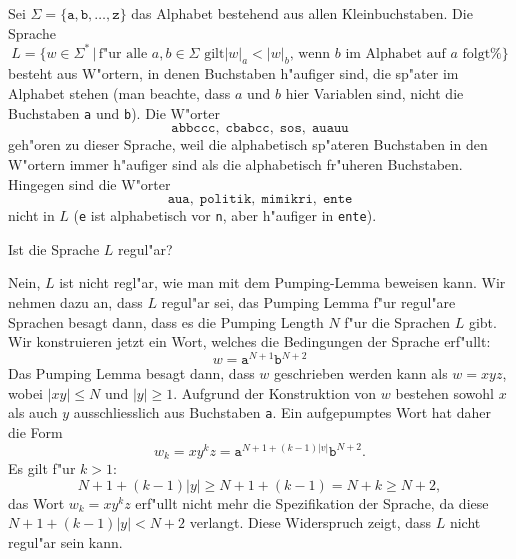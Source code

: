 Sei $\Sigma=\{\texttt{a},\texttt{b},\dots,\texttt{z}\}$ das Alphabet
bestehend aus allen Kleinbuchstaben. Die Sprache
\[
L=\{ w\in\Sigma^*
\,
|\,
\text{
f"ur alle $a,b\in\Sigma$ gilt
$|w|_a < |w|_b$, wenn $b$ im Alphabet auf $a$ folgt%
}
\}
\]
besteht aus W"ortern, in denen Buchstaben h"aufiger sind, die sp"ater im
Alphabet stehen (man beachte, dass $a$ und $b$ hier Variablen sind,
nicht die Buchstaben \texttt{a} und \texttt{b}).
Die W"orter
\[
\texttt{abbccc},\;
\texttt{cbabcc},\;
\texttt{sos},\;
\texttt{auauu}
\]
geh"oren zu dieser Sprache, weil die alphabetisch sp"ateren Buchstaben
in den W"ortern immer h"aufiger sind als die alphabetisch
fr"uheren Buchstaben. Hingegen sind die W"orter 
\[
\texttt{aua},\;
\texttt{politik},\;
\texttt{mimikri},\;
\texttt{ente}
\]
nicht in $L$ (\texttt{e} ist alphabetisch vor \texttt{n}, aber h"aufiger
in \texttt{ente}).

Ist die Sprache $L$ regul"ar?

\begin{loesung}
Nein, $L$ ist nicht regl"ar, wie man mit dem Pumping-Lemma beweisen kann.
Wir nehmen dazu an, dass $L$ regul"ar sei, das Pumping Lemma f"ur
regul"are Sprachen besagt dann, dass es die Pumping Length $N$ f"ur die
Sprachen $L$ gibt.
Wir konstruieren jetzt ein Wort, welches die Bedingungen der Sprache
erf"ullt:
\[
w=\texttt{a}^{N+1}\texttt{b}^{N+2}
\]
Das Pumping Lemma besagt dann, dass $w$ geschrieben werden kann als
$w=xyz$, wobei $|xy|\le N$ und $|y|\ge 1$. 
Aufgrund der Konstruktion von $w$ bestehen sowohl $x$ als auch $y$
ausschliesslich aus Buchstaben \texttt{a}.
Ein aufgepumptes Wort hat daher die Form
\[
w_k=xy^kz = \texttt{a}^{N+1+(k-1)|v|}\texttt{b}^{N+2}.
\]
Es gilt f"ur $k > 1$:
\[
N+1+(k-1)|y|\ge N+1+(k-1)=N+k\ge N+2,
\]
das Wort $w_k=xy^kz$ erf"ullt nicht mehr die Spezifikation der Sprache,
da diese $N+1+(k-1)|y| < N+2$ verlangt.
Diese Widerspruch zeigt, dass $L$ nicht regul"ar sein kann.
\end{loesung}

